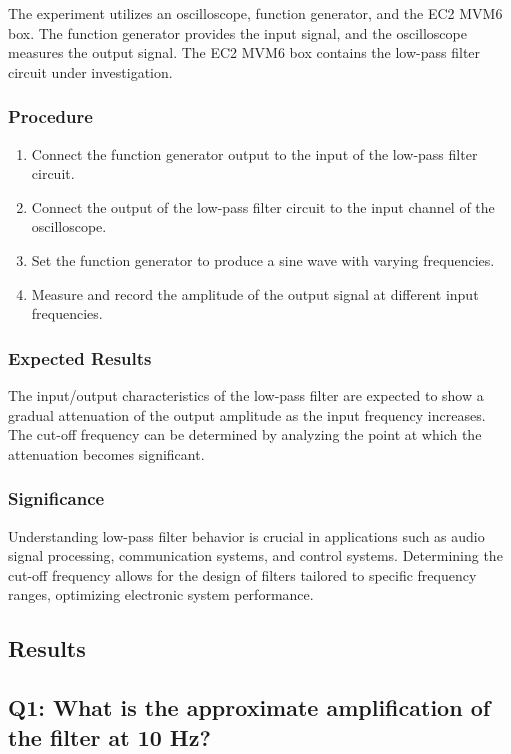 The experiment utilizes an oscilloscope, function generator, and the EC2 MVM6 box. The function generator provides the input signal, and the oscilloscope measures the output signal. The EC2 MVM6 box contains the low-pass filter circuit under investigation.

\subsubsection{Procedure}

\begin{enumerate}
    \item Connect the function generator output to the input of the low-pass filter circuit.
    \item Connect the output of the low-pass filter circuit to the input channel of the oscilloscope.
    \item Set the function generator to produce a sine wave with varying frequencies.
    \item Measure and record the amplitude of the output signal at different input frequencies.
\end{enumerate}


\subsubsection{Expected Results}

The input/output characteristics of the low-pass filter are expected to show a gradual attenuation of the output amplitude as the input frequency increases. The cut-off frequency can be determined by analyzing the point at which the attenuation becomes significant.

\subsubsection{Significance}

Understanding low-pass filter behavior is crucial in applications such as audio signal processing, communication systems, and control systems. Determining the cut-off frequency allows for the design of filters tailored to specific frequency ranges, optimizing electronic system performance.


\subsection{Results}
\subsection{Q1: What is the approximate amplification of the filter at 10 Hz?}

